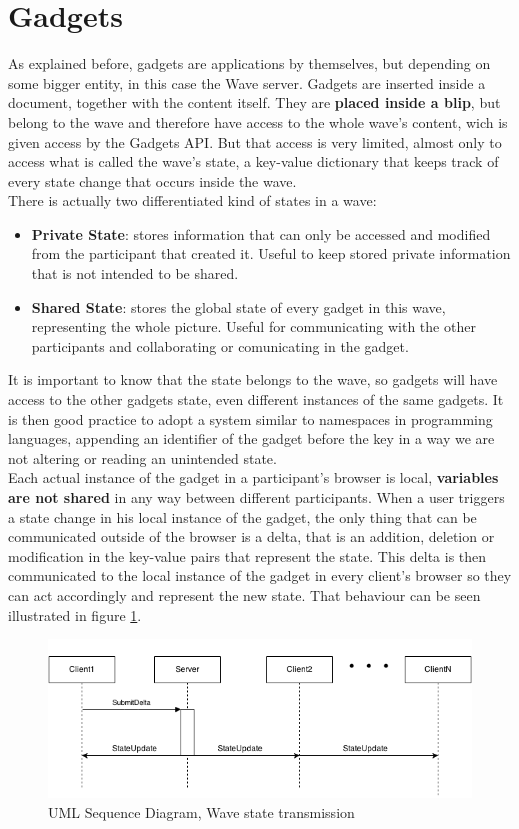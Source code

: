 \section{Gadgets}
As explained before, gadgets are applications by themselves, but depending on some bigger entity, in this case the Wave server. Gadgets are inserted inside a document, together with the content itself. They are \textbf{placed inside a blip}, but belong to the wave and therefore have access to the whole wave's content, wich is given access by the Gadgets API. But that access is very limited, almost only to access what is called the wave's state, a key-value dictionary that keeps track of every state change that occurs inside the wave.\\[.2cm]
There is actually two differentiated kind of states in a wave:
\begin{itemize}
  \item \textbf{Private State}: stores information that can only be accessed and modified from the participant that created it. Useful to keep stored private information that is not intended to be shared.
  \item \textbf{Shared State}: stores the global state of every gadget in this wave, representing the whole picture. Useful for communicating with the other participants and collaborating or comunicating in the gadget.
\end{itemize}
It is important to know that the state belongs to the wave, so gadgets will have access to the other gadgets state, even different instances of the same gadgets. It is then good practice to adopt a system similar to namespaces in programming languages, appending an identifier of the gadget before the key in a way we are not altering or reading an unintended state.\\[.2cm]
Each actual instance of the gadget in a participant's browser is local, \textbf{variables are not shared} in any way between different participants. When a user triggers a state change in his local instance of the gadget, the only thing that can be communicated outside of the browser is a delta, that is an addition, deletion or modification in the key-value pairs that represent the state. This delta is then communicated to the local instance of the gadget in every client's browser so they can act accordingly and represent the new state. That behaviour can be seen illustrated in figure \ref{fig:wave_state}.
\begin{figure}[H]
  \center
    \includegraphics[keepaspectratio, scale=0.6]{Media/Diagrams/Wave/StateSequence.png}
  \caption{UML Sequence Diagram, Wave state transmission}
  \label{fig:wave_state}
\end{figure}
